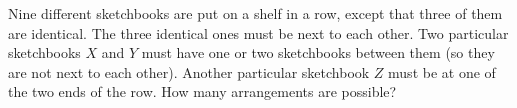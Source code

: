 Nine different sketchbooks are put on a shelf in a row, except that three of them are identical. The three identical ones must be next to each other. Two particular sketchbooks $X$ and $Y$ must have one or two sketchbooks between them (so they are not next to each other). Another particular sketchbook $Z$ must be at one of the two ends of the row. How many arrangements are possible?
